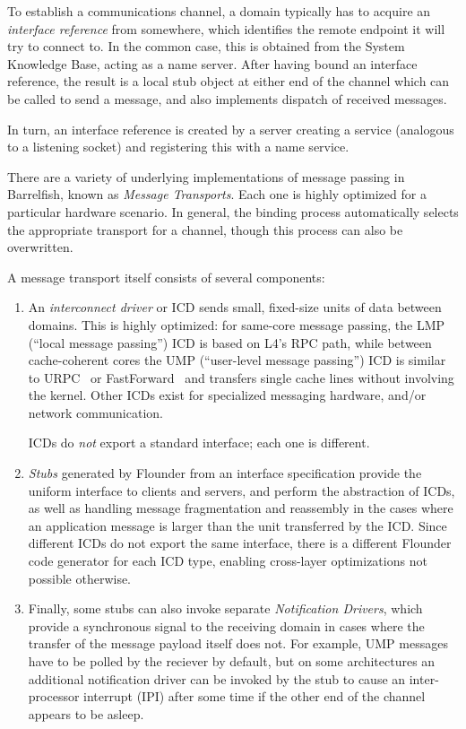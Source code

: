 \documentclass[a4paper,twoside]{report} %
\begin{document}
To establish a communications channel, a domain typically has to
acquire an \emph{interface reference} from somewhere, which identifies
the remote endpoint it will try to connect to.  In the common case,
this is obtained from the System Knowledge Base, acting as a name
server. After having bound an interface reference, the result is a
local stub object at either end of the channel which can be called to
send a message, and also implements dispatch of received messages. 

In turn, an interface reference is created by a server creating a
service (analogous to a listening socket) and registering this with a
name service. 

There are a variety of underlying implementations of message passing
in Barrelfish, known as \emph{Message Transports}.  Each one is highly
optimized for a particular hardware scenario.  In general, the binding
process automatically selects the appropriate transport for a channel,
though this process can also be overwritten. 

A message transport itself consists of several components:
\begin{enumerate}
\item An \emph{interconnect driver} or ICD sends small, fixed-size
  units of data between domains.  This is highly optimized: for
  same-core message passing, the LMP (``local message passing'') ICD
  is based on L4's RPC path, while between cache-coherent cores the
  UMP (``user-level message passing'') ICD is similar to
  URPC~\cite{urpc:tocs91} or
  FastForward~\cite{Giacomoni:2008:FEP:1345206.1345215} and transfers
  single cache lines without involving the kernel.  Other ICDs exist
  for specialized messaging hardware, and/or network communication.

  ICDs do \emph{not} export a standard interface; each one is
  different. 
\item \emph{Stubs} generated by Flounder from an interface
  specification provide the uniform interface to clients and servers,
  and perform the abstraction of ICDs, as well as handling message
  fragmentation and reassembly in the cases where an application
  message is larger than the unit transferred by the ICD.  Since
  different ICDs do not export the same interface, there is a
  different Flounder code generator for each ICD type, enabling
  cross-layer optimizations not possible otherwise. 
\item Finally, some stubs can also invoke separate \emph{Notification
  Drivers}, which provide a synchronous signal to the receiving domain
  in cases where the transfer of the message payload itself does not.
  For example, UMP messages have to be polled by the reciever by
  default, but on some architectures an additional notification driver
  can be invoked by the stub to cause an inter-processor interrupt
  (IPI) after some time if the other end of the channel appears to be
  asleep. 
\end{enumerate}
\end{document}
